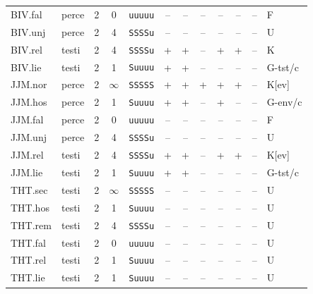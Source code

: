 {\begin{longtable}{@{}llcccccccccl@{}}
BIV.fal & perce & 2 & 0 & \texttt{uuuuu} & \textsf{--} & \textsf{--} & \textsf{--} & \textsf{--} & \textsf{--} & -- & F \\
BIV.unj & perce & 2 & 4 & \texttt{SSSSu} & \textsf{--} & \textsf{--} & \textsf{--} & \textsf{--} & \textsf{--} & -- & U \\
BIV.rel & testi & 2 & 4 & \texttt{SSSSu} & \textsf{+} & \textsf{+} & \textsf{--} & \textsf{+} & \textsf{+} & -- & K \\
BIV.lie & testi & 2 & 1 & \texttt{Suuuu} & \textsf{+} & \textsf{+} & \textsf{--} & \textsf{--} & \textsf{--} & -- & G-tst/c \\
JJM.nor & perce & 2 & $\infty$ & \texttt{SSSSS} & \textsf{+} & \textsf{+} & \textsf{+} & \textsf{+} & \textsf{+} & -- & K[ev] \\
JJM.hos & perce & 2 & 1 & \texttt{Suuuu} & \textsf{+} & \textsf{+} & \textsf{--} & \textsf{+} & \textsf{--} & -- & G-env/c \\
JJM.fal & perce & 2 & 0 & \texttt{uuuuu} & \textsf{--} & \textsf{--} & \textsf{--} & \textsf{--} & \textsf{--} & -- & F \\
JJM.unj & perce & 2 & 4 & \texttt{SSSSu} & \textsf{--} & \textsf{--} & \textsf{--} & \textsf{--} & \textsf{--} & -- & U \\
JJM.rel & testi & 2 & 4 & \texttt{SSSSu} & \textsf{+} & \textsf{+} & \textsf{--} & \textsf{+} & \textsf{+} & -- & K[ev] \\
JJM.lie & testi & 2 & 1 & \texttt{Suuuu} & \textsf{+} & \textsf{+} & \textsf{--} & \textsf{--} & \textsf{--} & -- & G-tst/c \\
THT.sec & testi & 2 & $\infty$ & \texttt{SSSSS} & \textsf{--} & \textsf{--} & \textsf{--} & \textsf{--} & \textsf{--} & -- & U \\
THT.hos & testi & 2 & 1 & \texttt{Suuuu} & \textsf{--} & \textsf{--} & \textsf{--} & \textsf{--} & \textsf{--} & -- & U \\
THT.rem & testi & 2 & 4 & \texttt{SSSSu} & \textsf{--} & \textsf{--} & \textsf{--} & \textsf{--} & \textsf{--} & -- & U \\
THT.fal & testi & 2 & 0 & \texttt{uuuuu} & \textsf{--} & \textsf{--} & \textsf{--} & \textsf{--} & \textsf{--} & -- & U \\
THT.rel & testi & 2 & 1 & \texttt{Suuuu} & \textsf{--} & \textsf{--} & \textsf{--} & \textsf{--} & \textsf{--} & -- & U \\
THT.lie & testi & 2 & 1 & \texttt{Suuuu} & \textsf{--} & \textsf{--} & \textsf{--} & \textsf{--} & \textsf{--} & -- & U \\

\end{longtable}}
